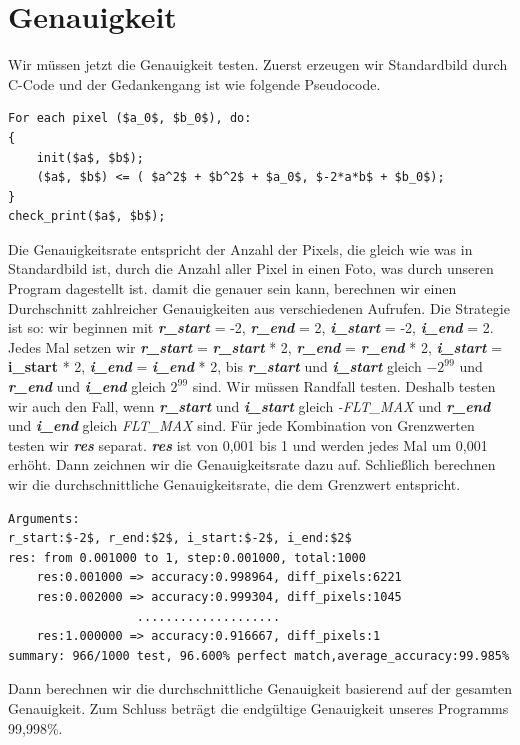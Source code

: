 \documentclass[course=erap]{aspdoc}
\begin{document}
\section{Genauigkeit}
Wir müssen jetzt die Genauigkeit testen.
Zuerst erzeugen wir Standardbild durch C-Code und der Gedankengang ist wie folgende Pseudocode.
\begin{lstlisting}[mathescape=true]
For each pixel ($a_0$, $b_0$), do:
{
    init($a$, $b$);
    ($a$, $b$) <= ( $a^2$ + $b^2$ + $a_0$, $-2*a*b$ + $b_0$);
}
check_print($a$, $b$);
\end{lstlisting}
Die Genauigkeitsrate entspricht der Anzahl der Pixels, die gleich wie was in Standardbild ist, durch die Anzahl aller Pixel in einen Foto, was durch unseren Program dagestellt ist. damit die genauer sein kann, berechnen wir einen Durchschnitt zahlreicher Genauigkeiten aus verschiedenen Aufrufen. Die Strategie ist so: wir beginnen mit \textbf{\emph{r\_start}} = -2, \emph{\textbf{r\_end}} = 2, \textbf{\emph{i\_start}} = -2, \emph{\textbf{i\_end}} = 2. Jedes Mal setzen wir \textbf{\emph{r\_start}} = \emph{\textbf{r\_start}} * 2, \textbf{\emph{r\_end}} = \emph{\textbf{r\_end}} * 2, \textbf{\emph{i\_start}} = \textbf{\textbf{i\_start}} * 2, \emph{\textbf{i\_end}} = \textbf{\emph{i\_end}} * 2, bis \emph{\textbf{r\_start}} und \textbf{\emph{i\_start}} gleich $-2^{99}$ und \emph{\textbf{r\_end}} und \textbf{\emph{i\_end}} gleich $2^{99}$ sind. Wir müssen Randfall testen. Deshalb testen wir auch den Fall, wenn \emph{\textbf{r\_start}} und \textbf{\emph{i\_start}} gleich \emph{-FLT\_MAX} und \emph{\textbf{r\_end}} und \textbf{\emph{i\_end}} gleich \emph{FLT\_MAX} sind. Für jede Kombination von Grenzwerten testen wir \emph{\textbf{res}} separat. \textbf{\emph{res}} ist von 0,001 bis 1 und werden jedes Mal um 0,001 erhöht. Dann zeichnen wir die Genauigkeitsrate dazu auf. Schließlich berechnen wir die durchschnittliche Genauigkeitsrate, die dem Grenzwert entspricht.
\begin{lstlisting}
Arguments:
r_start:$-2$, r_end:$2$, i_start:$-2$, i_end:$2$
res: from 0.001000 to 1, step:0.001000, total:1000
	res:0.001000 => accuracy:0.998964, diff_pixels:6221
	res:0.002000 => accuracy:0.999304, diff_pixels:1045
                  ....................
    res:1.000000 => accuracy:0.916667, diff_pixels:1
summary: 966/1000 test, 96.600% perfect match,average_accuracy:99.985%
\end{lstlisting}
Dann berechnen wir die durchschnittliche Genauigkeit basierend auf der gesamten Genauigkeit. Zum Schluss beträgt die endgültige Genauigkeit unseres Programms 99,998\%.
\end{document}
